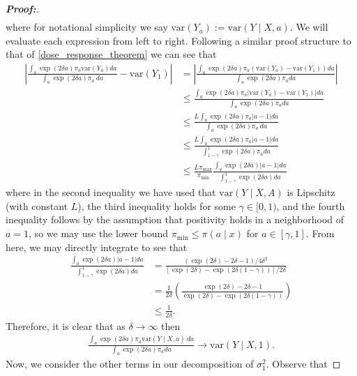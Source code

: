 \documentclass[10pt,a4paper]{amsart}
\newcommand{\var}{\text{var}}
\begin{document}
\begin{proof}[\textbf{Proof:}]
\begin{align*}
\end{align*}
where for notational simplicity we say $\var(Y_a) := \var(Y \mid X, a)$. We will evaluate each expression from left to right. Following a similar proof structure to that of \cref{dose_response_theorem} we can see that
\begin{align*}
     \left| \frac{\int_a \exp(2 \delta a) \pi_a \var(Y_a) da}{\int_a \exp(2 \delta a) \pi_a \ da } - \var(Y_1)\right| &= \left| \frac{\int_a \exp(2 \delta a) \pi_a (\var(Y_a) - \var(Y_1)) da}{\int_a \exp(2 \delta a) \pi_a da } \right| \\
     &\leq  \frac{\int_a \exp(2 \delta a) \pi_a \big|\var(Y_a) - \var(Y_1)\big| da}{\int_a \exp(2 \delta a) \pi_a da } \\
     &\leq \frac{L\int_a \exp(2 \delta a) \pi_a \big|a - 1 \big| da}{\int_a \exp(2 \delta a) \pi_a \ da } \\
     &\leq \frac{L \int_a \exp(2 \delta a) \pi_a \big|a - 1 \big| da}{\int^1_{1 - \gamma} \exp(2 \delta a) \pi_a da } \\
     &\leq \frac{L \pi_{\max}}{\pi_{\min}}\frac{ \int_a \exp(2 \delta a) \big|a - 1 \big| da}{\int^1_{1 - \gamma} \exp(2 \delta a) da } 
\end{align*}
where in the second inequality we have used that $\var(Y \mid X, A)$ is Lipschitz (with constant $L$), the third inequality holds for some $\gamma \in [0, 1)$, and the fourth inequality follows by the assumption that positivity holds in a neighborhood of $a = 1$, so we may use the lower bound $\pi_{\min} \leq \pi(a \mid x)$ for $a \in [\gamma, 1]$. From here, we may directly integrate to see that
\begin{align*}
    \frac{ \int_a \exp(2 \delta a)\big|a - 1 \big| da}{\int^1_{1 - \gamma} \exp(2 \delta a) da } &= \frac{(\exp(2 \delta) - 2\delta - 1) / 4 \delta^2}{[\exp(2 \delta) - \exp(2 \delta (1 - \gamma))] / 2 \delta } \\
    &= \frac{1}{2 \delta} \left( \frac{\exp(2 \delta) - 2\delta - 1}{\exp(2 \delta) - \exp(2 \delta (1 - \gamma))} \right) \\
    &\leq \frac{1}{2 \delta}.
\end{align*}
Therefore, it is clear that as $\delta \to \infty$ then
\begin{align*}
    \frac{\int_a \exp(2 \delta a) \pi_a \var(Y \mid X, a) \ da}{\int_a \exp(2 \delta a) \pi_a da } \longrightarrow \var(Y \mid X, 1).
\end{align*}
Now, we consider the other terms in our decomposition of $\sigma^2_1$. Observe that

\end{proof}
\end{document}
